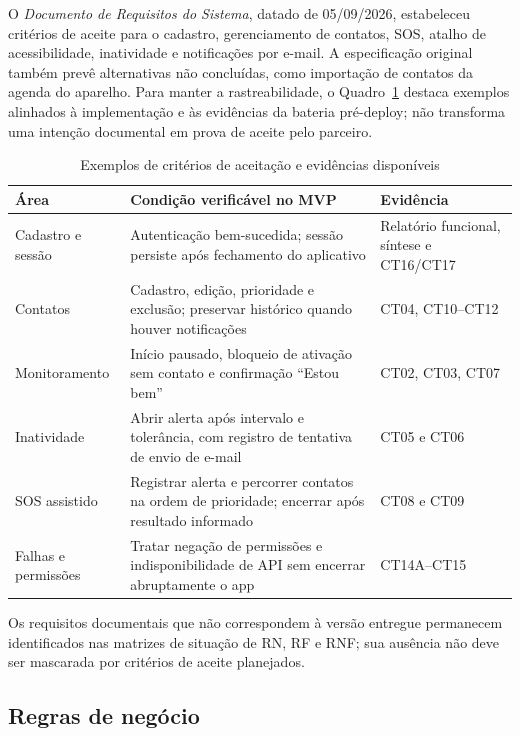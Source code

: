 O \emph{Documento de Requisitos do Sistema}, datado de 05/09/2026, estabeleceu critérios de aceite para o cadastro, gerenciamento de contatos, SOS, atalho de acessibilidade, inatividade e notificações por e-mail. A especificação original também prevê alternativas não concluídas, como importação de contatos da agenda do aparelho. Para manter a rastreabilidade, o Quadro~\ref{tab_aceite_2026} destaca exemplos alinhados à implementação e às evidências da bateria pré-deploy; não transforma uma intenção documental em prova de aceite pelo parceiro.

\begin{table}[H]
\caption{Exemplos de critérios de aceitação e evidências disponíveis}
\label{tab_aceite_2026}
\centering\footnotesize
\renewcommand{\arraystretch}{1.12}
\begin{tabular}{p{3.0cm}p{6.45cm}p{3.0cm}}\hline
\textbf{Área} & \textbf{Condição verificável no MVP} & \textbf{Evidência}\\\hline
Cadastro e sessão & Autenticação bem-sucedida; sessão persiste após fechamento do aplicativo & Relatório funcional, síntese e CT16/CT17\\\hline
Contatos & Cadastro, edição, prioridade e exclusão; preservar histórico quando houver notificações & CT04, CT10--CT12\\\hline
Monitoramento & Início pausado, bloqueio de ativação sem contato e confirmação ``Estou bem'' & CT02, CT03, CT07\\\hline
Inatividade & Abrir alerta após intervalo e tolerância, com registro de tentativa de envio de e-mail & CT05 e CT06\\\hline
SOS assistido & Registrar alerta e percorrer contatos na ordem de prioridade; encerrar após resultado informado & CT08 e CT09\\\hline
Falhas e permissões & Tratar negação de permissões e indisponibilidade de API sem encerrar abruptamente o app & CT14A--CT15\\\hline
\end{tabular}
\end{table}

Os requisitos documentais que não correspondem à versão entregue permanecem identificados nas matrizes de situação de RN, RF e RNF; sua ausência não deve ser mascarada por critérios de aceite planejados.

\subsection{Regras de negócio}


